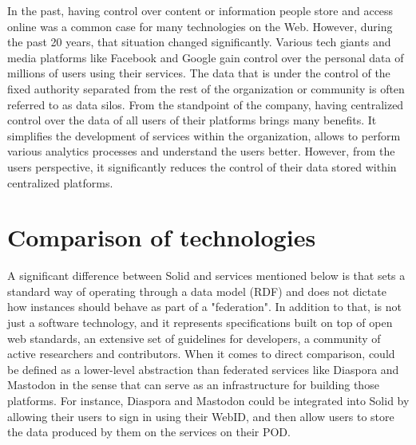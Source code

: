 In the past, having control over content or information people store and access online was a common case for many technologies on the Web. However, during the past 20 years, that situation changed significantly. Various tech giants and media platforms like Facebook and Google gain control over the personal data of millions of users using their services. The data that is under the control of the fixed authority separated from the rest of the organization or community is often referred to as data silos.  From the standpoint of the company, having centralized control over the data of all users of their platforms brings many benefits. It simplifies the development of services within the organization, allows to perform various analytics processes and understand the users better. However, from the users perspective, it significantly reduces the control of their data stored within centralized platforms.

\section{Comparison of technologies}
\label{sssec:comparison_of_technologies}

A significant difference between Solid and services mentioned below is that \solid{} sets a standard way of operating through a data model (RDF) and does not dictate how instances should behave as part of a "federation". In addition to that, \solid{} is not just a software technology, and it represents specifications built on top of open web standards, an extensive set of guidelines for developers, a community of active researchers and contributors. When it comes to direct comparison, \solid{} could be defined as a lower-level abstraction than federated services like Diaspora and Mastodon in the sense that \solid{} can serve as an infrastructure for building those platforms. For instance, Diaspora and Mastodon could be integrated into Solid by allowing their users to sign in using their WebID, and then allow users to store the data produced by them on the services on their POD. 

